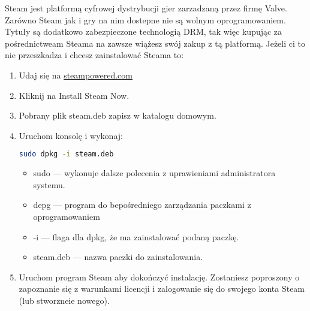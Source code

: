 Steam jest platformą cyfrowej dystrybucji gier zarzadzaną przez firmę Valve. Zarówno Steam jak i gry na nim dostepne nie są wolnym oprogramowaniem. Tytuły są dodatkowo zabezpieczone technologią DRM, tak więc kupując za pośrednictweam Steama na zawsze wiążesz swój zakup z tą platformą. Jeżeli ci to nie przeszkadza i chcesz zainstalować Steama to:
\begin{enumerate}
\item Udaj się na \href{http://store.steampowered.com/about/}{steampowered.com}
\item Kliknij na \textcolor{ubuntu_orange}{Install Steam Now}.
\item Pobrany plik steam.deb zapisz w katalogu domowym.
\item Uruchom konsolę  i wykonaj:
\begin{lstlisting}[language=bash]
sudo dpkg -i steam.deb
\end{lstlisting}
\begin{itemize}
\item \textcolor{ubuntu_orange}{sudo} --- wykonuje dalsze polecenia z uprawieniami administratora systemu.
\item \textcolor{ubuntu_orange}{depg} --- program do bepośredniego zarządzania paczkami z oprogramowaniem
\item \textcolor{ubuntu_orange}{-i} --- flaga dla dpkg, że ma zainstalować podaną paczkę.
\item \textcolor{ubuntu_orange}{steam.deb} --- nazwa paczki do zainstalowania.
\end{itemize}
\item Uruchom program Steam aby dokończyć instalację. Zostaniesz poproszony o zapoznanie się z warunkami licencji i zalogowanie się do swojego konta Steam (lub stworzneie nowego).
\end{enumerate}